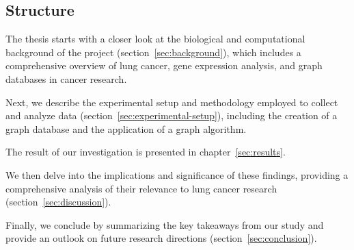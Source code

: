 \subsection{Structure}  \label{subsec:structure}
The thesis starts with a closer look at the biological and computational background of the project (section~\ref{sec:background}),
which includes a comprehensive overview of lung cancer, gene expression analysis, and graph databases in cancer research.

Next, we describe the experimental setup and methodology employed to collect and analyze data (section~\ref{sec:experimental-setup}),
including the creation of a graph database and the application of a graph algorithm.

The result of our investigation is presented in chapter~\ref{sec:results}.

We then delve into the implications and significance of these findings,
providing a comprehensive analysis of their relevance to lung cancer research (section~\ref{sec:discussion}).

Finally, we conclude by summarizing the key takeaways from our study and provide an outlook
on future research directions (section~\ref{sec:conclusion}).

